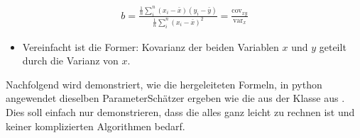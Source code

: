 \documentclass[letterpaper,10pt,english]{jupyterBook}
\begin{document}
\begin{equation*}
\begin{split} b = \frac{\frac{1}{n}\sum_i^n(x_i - \bar{x})(y_i - \bar{y})}{\frac{1}{n}\sum_i^n (x_i - \bar{x})^2} = 
\frac{\text{cov}_{xy}}{\text{var}_x}\end{split}
\end{equation*}\begin{itemize}
\item {} 
\sphinxAtStartPar
Vereinfacht ist die Former: Kovarianz der beiden Variablen \(x\) und \(y\) geteilt durch die Varianz von \(x\).

\end{itemize}

\sphinxAtStartPar
Nachfolgend wird demonstriert, wie die hergeleiteten Formeln, in python angewendet dieselben Parameter\sphinxhyphen{}Schätzer ergeben wie die aus der Klasse  aus . Dies soll einfach nur demonstrieren, dass die alles ganz leicht zu rechnen ist und keiner komplizierten Algorithmen bedarf.
\end{document}
